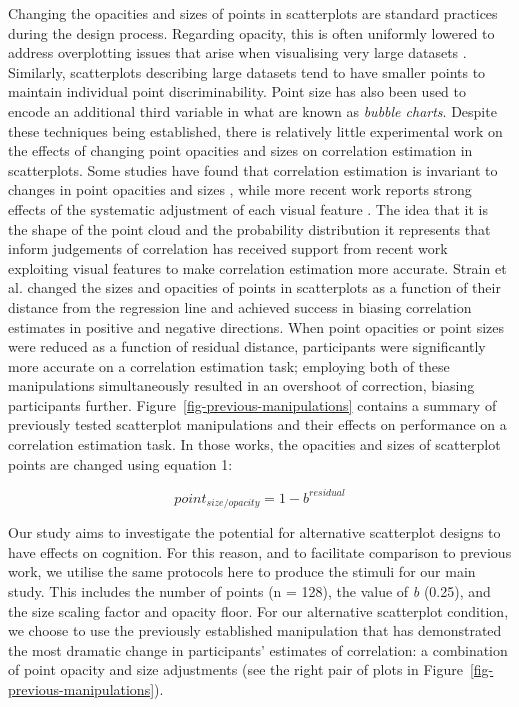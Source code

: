 \documentclass[sigconf]{acmart}
\begin{document}
Changing the opacities and sizes of points in scatterplots are standard
practices during the design process. Regarding opacity, this is often
uniformly lowered to address overplotting issues that arise when
visualising very large datasets \citep{matejka_2015}. Similarly,
scatterplots describing large datasets tend to have smaller points to
maintain individual point discriminability. Point size has also been
used to encode an additional third variable in what are known as
\emph{bubble charts}. Despite these techniques being established, there
is relatively little experimental work on the effects of changing point
opacities and sizes on correlation estimation in scatterplots. Some
studies have found that correlation estimation is invariant to changes
in point opacities and sizes \citep{rensink_2014, rensink_2017}, while
more recent work reports strong effects of the systematic adjustment of
each visual feature \citep{strain_2023, strain_2023b, strain_2024}. The
idea that it is the shape of the point cloud and the probability
distribution it represents that inform judgements of correlation has
received support from recent work exploiting visual features to make
correlation estimation more accurate. Strain et al.
\citep{strain_2023, strain_2023b, strain_2024} changed the sizes and
opacities of points in scatterplots as a function of their distance from
the regression line and achieved success in biasing correlation
estimates in positive and negative directions. When point opacities
\citep{strain_2023} or point sizes \citep{strain_2023b} were reduced as
a function of residual distance, participants were significantly more
accurate on a correlation estimation task; employing both of these
manipulations simultaneously \citep{strain_2024} resulted in an
overshoot of correction, biasing participants further.
Figure~\ref{fig-previous-manipulations} contains a summary of previously
tested scatterplot manipulations and their effects on performance on a
correlation estimation task. In those works, the opacities and sizes of
scatterplot points are changed using equation 1:

\begin{equation}
  point_{size/opacity} = 1 - b^{residual}
\end{equation}

Our study aims to investigate the potential for alternative scatterplot
designs to have effects on cognition. For this reason, and to facilitate
comparison to previous work, we utilise the same protocols here to
produce the stimuli for our main study. This includes the number of
points (n = 128), the value of \emph{b} (0.25), and the size scaling
factor and opacity floor. For our alternative scatterplot condition, we
choose to use the previously established manipulation that has
demonstrated the most dramatic change in participants' estimates of
correlation: a combination of point opacity and size adjustments
\citep{strain_2024} (see the right pair of plots in
Figure~\ref{fig-previous-manipulations}).
\end{document}
